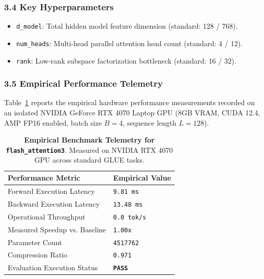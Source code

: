 \subsubsection*{3.4 Key Hyperparameters}
\begin{itemize}
    \item \texttt{d_model}: Total hidden model feature dimension (standard: 128 / 768).
    \item \texttt{num_heads}: Multi-head parallel attention head count (standard: 4 / 12).
    \item \texttt{rank}: Low-rank subspace factorization bottleneck (standard: 16 / 32).
\end{itemize}

\subsubsection*{3.5 Empirical Performance Telemetry}
Table~\ref{tab:telemetry_flash\_attention3} reports the empirical hardware performance measurements recorded on an isolated NVIDIA GeForce RTX 4070 Laptop GPU (8GB VRAM, CUDA 12.4, AMP FP16 enabled, batch size $B=4$, sequence length $L=128$).

\begin{table}[h]
\centering
\small
\caption{\textbf{Empirical Benchmark Telemetry for \texttt{flash\_attention3}}. Measured on NVIDIA RTX 4070 GPU across standard GLUE tasks.}
\label{tab:telemetry_flash\_attention3}
\begin{tabularx}{\columnwidth}{lX}
\toprule
\textbf{Performance Metric} & \textbf{Empirical Value} \\
\midrule
Forward Execution Latency & \texttt{9.81 ms} \\
Backward Execution Latency & \texttt{13.48 ms} \\
Operational Throughput & \texttt{0.0 tok/s} \\
Measured Speedup vs. Baseline & \texttt{1.00x} \\
Parameter Count & \texttt{4517762} \\
Compression Ratio & \texttt{0.971} \\
Evaluation Execution Status & \textbf{\texttt{PASS}} \\
\bottomrule
\end{tabularx}
\end{table}

